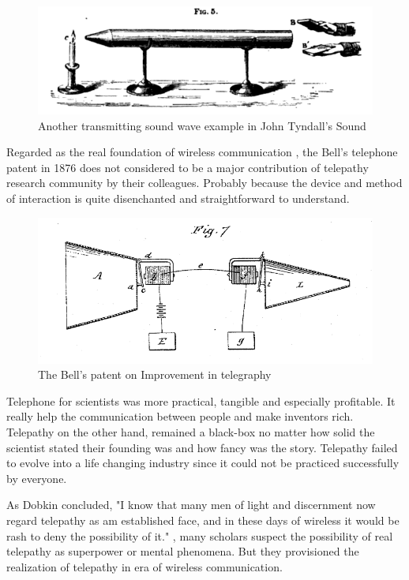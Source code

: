 \documentclass[a4paper]{article}
\begin{document}
\begin{figure}
	\centering
	\includegraphics[width= \linewidth]{Sound2}
	\caption{Another transmitting sound wave example in John Tyndall's Sound}
	\label{fig:Sound1}
\end{figure}

Regarded as the real foundation of wireless communication \autocite{bell1876improvement}, the Bell's telephone patent in 1876 does not considered to be a major contribution of telepathy research community by their colleagues. Probably because the device and method of interaction is quite disenchanted and straightforward to understand.

\begin{figure}
	\centering
	\includegraphics[width= \linewidth]{Bell}
	\caption{The Bell's patent on Improvement in telegraphy}
	\label{fig:Bell}
\end{figure}

Telephone for scientists was more practical, tangible and especially profitable. It really help the communication between people and make inventors rich. Telepathy on the other hand, remained a black-box no matter how solid the scientist stated their founding was and how fancy was the story. Telepathy failed to evolve into a life changing industry since it could not be practiced successfully by everyone.

As Dobkin concluded, "I know that many men of light and discernment now regard telepathy as am established face, and in these days of wireless it would be rash to deny the possibility of it." \autocite{luckhurst2002invention}, many scholars suspect the possibility of real telepathy as superpower or mental phenomena. But they provisioned the realization of telepathy in era of wireless communication.
\end{document}
